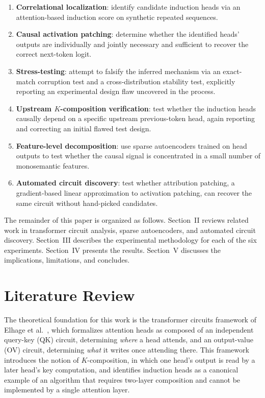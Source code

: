 \documentclass[conference]{IEEEtran}
\begin{document}
\begin{enumerate}
    \item \textbf{Correlational localization}: identify candidate induction heads via an attention-based induction score on synthetic repeated sequences.
    \item \textbf{Causal activation patching}: determine whether the identified heads' outputs are individually and jointly necessary and sufficient to recover the correct next-token logit.
    \item \textbf{Stress-testing}: attempt to falsify the inferred mechanism via an exact-match corruption test and a cross-distribution stability test, explicitly reporting an experimental design flaw uncovered in the process.
    \item \textbf{Upstream $K$-composition verification}: test whether the induction heads causally depend on a specific upstream previous-token head, again reporting and correcting an initial flawed test design.
    \item \textbf{Feature-level decomposition}: use sparse autoencoders trained on head outputs to test whether the causal signal is concentrated in a small number of monosemantic features.
    \item \textbf{Automated circuit discovery}: test whether attribution patching, a gradient-based linear approximation to activation patching, can recover the same circuit without hand-picked candidates.
\end{enumerate}

The remainder of this paper is organized as follows. Section~II reviews related work in transformer circuit analysis, sparse autoencoders, and automated circuit discovery. Section~III describes the experimental methodology for each of the six experiments. Section~IV presents the results. Section~V discusses the implications, limitations, and concludes.

\section{Literature Review}

The theoretical foundation for this work is the transformer circuits framework of Elhage et al.~\cite{elhage2021}, which formalizes attention heads as composed of an independent query-key (QK) circuit, determining \emph{where} a head attends, and an output-value (OV) circuit, determining \emph{what} it writes once attending there. This framework introduces the notion of $K$-composition, in which one head's output is read by a later head's key computation, and identifies induction heads as a canonical example of an algorithm that requires two-layer composition and cannot be implemented by a single attention layer.
\end{document}
